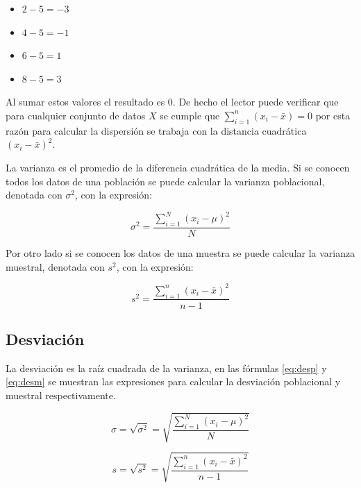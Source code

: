 \documentclass[letterpaper,]{book}
\providecommand{\tightlist}{%
  \setlength{\itemsep}{0pt}\setlength{\parskip}{0pt}}
\begin{document}
\begin{itemize}
\tightlist
\item
  \(2-5=-3\)
\item
  \(4-5=-1\)
\item
  \(6-5=1\)
\item
  \(8-5=3\)
\end{itemize}

Al sumar estos valores el resultado es \(0\). De hecho el lector puede verificar que para cualquier conjunto de datos \(X\) se cumple que \(\sum_{i=1}^n{\left(x_i-\bar{x}\right)}=0\) por esta razón para calcular la dispersión se trabaja con la distancia cuadrática \(\left(x_i-\bar{x}\right)^2\).

La varianza es el promedio de la diferencia cuadrática de la media. Si se conocen todos los datos de una población se puede calcular la varianza poblacional, denotada con \(\sigma^2\), con la expresión:

\begin{equation} 
  \sigma^2 = \dfrac{\sum_{i=1}^{N}\left(x_i- \mu \right)^2}{N}
  \label{eq:varp}
\end{equation}

Por otro lado si se conocen los datos de una muestra se puede calcular la varianza muestral, denotada con \(s^2\), con la expresión:

\begin{equation} 
  s^2 = \dfrac{\sum_{i=1}^{n}\left(x_i - \bar{x} \right)^2}{n-1}
  \label{eq:varm}
\end{equation}

\hypertarget{desviacion}{%
\subsection{Desviación}\label{desviacion}}

La desviación es la raíz cuadrada de la varianza, en las fórmulas \eqref{eq:desp} y \eqref{eq:desm} se muestran las expresiones para calcular la desviación poblacional y muestral respectivamente.

\begin{equation} 
  \sigma = \sqrt{\sigma^2} = \sqrt{\dfrac{\sum_{i=1}^{N}\left(x_i- \mu \right)^2}{N}}
  \label{eq:desp}
\end{equation}

\begin{equation} 
  s = \sqrt{s^2} = \sqrt{\dfrac{\sum_{i=1}^{n}\left(x_i- \bar{x} \right)^2}{n-1}}
  \label{eq:desm}
\end{equation}
\end{document}
